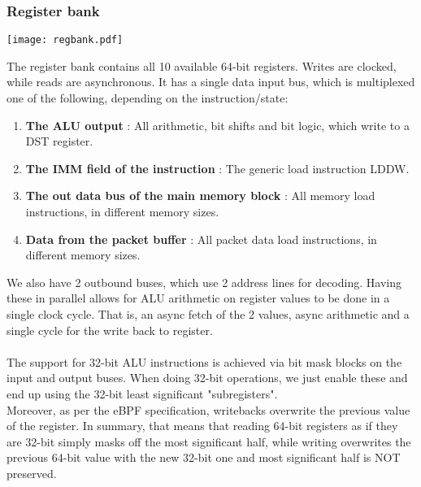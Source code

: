 \documentclass{l4proj}
\begin{document}
\subsubsection{Register bank}
\begin{center}
\texttt{[image: regbank.pdf]}\\
\end{center}
The register bank contains all 10 available 64-bit registers. Writes are clocked, while reads are asynchronous. It has a single data input bus, which is multiplexed one of the following, depending on the instruction/state:
\begin{enumerate}
    \item \textbf{The ALU output} : All arithmetic, bit shifts and bit logic, which write to a DST register.
    \item \textbf{The IMM field of the instruction} : The generic load instruction LDDW.
    \item \textbf{The out data bus of the main memory block} : All memory load instructions, in different memory sizes.
    \item \textbf{Data from the packet buffer} : All packet data load instructions, in different memory sizes.
\end{enumerate}
We also have 2 outbound buses, which use 2 address lines for decoding. Having these in parallel allows for ALU arithmetic on register values to be done in a single clock cycle. That is, an async fetch of the 2 values, async arithmetic and a single cycle for the write back to register.\\\\
The support for 32-bit ALU instructions is achieved via bit mask blocks on the input and output buses. When doing 32-bit operations, we just enable these and end up using the 32-bit least significant "subregisters".\\
Moreover, as per the eBPF specification, writebacks overwrite the previous value of the register. In summary, that means that reading 64-bit registers as if they are 32-bit simply masks off the most significant half, while writing overwrites the previous 64-bit value with the new 32-bit one and most significant half is NOT preserved.
\end{document}
